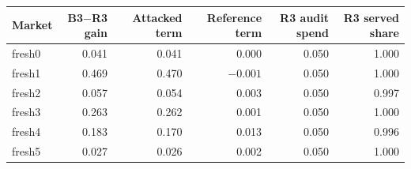 \begin{tabular}{@{}lrrrrr@{}}\toprule
Market & B3$-$R3 gain & Attacked term & Reference term & R3 audit spend & R3 served share \\\midrule
fresh0 & 0.041 & 0.041 & 0.000 & 0.050 & 1.000 \\
fresh1 & 0.469 & 0.470 & \ensuremath{-0.001} & 0.050 & 1.000 \\
fresh2 & 0.057 & 0.054 & 0.003 & 0.050 & 0.997 \\
fresh3 & 0.263 & 0.262 & 0.001 & 0.050 & 1.000 \\
fresh4 & 0.183 & 0.170 & 0.013 & 0.050 & 0.996 \\
fresh5 & 0.027 & 0.026 & 0.002 & 0.050 & 1.000 \\
\bottomrule\end{tabular}
